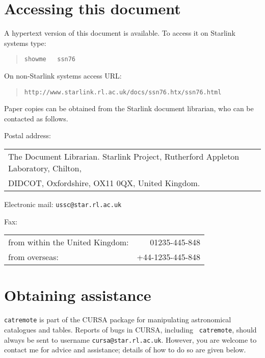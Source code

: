 \documentclass[twoside,11pt]{article}
\newcommand{\htmladdnormallink}[2]{#1}
\renewcommand{\_}{\texttt{\symbol{95}}}
\begin{document}
\newpage
\section*{Accessing this document}

A hypertext version of this document is available.  To access it on
Starlink systems type:

\begin{quote}
{\tt showme ~ ssn76}
\end{quote}

On non-Starlink systems access URL:

\begin{quote}
\htmladdnormallink{
{\tt http://www.starlink.rl.ac.uk/docs/ssn76.htx/ssn76.html}}
{http://www.starlink.rl.ac.uk/docs/ssn75.htx/ssn76.html}
\end{quote}

Paper copies can be obtained from the Starlink document librarian,
who can be contacted as follows.

Postal address: \\
\begin{tabular}{l}
The Document Librarian. Starlink Project, Rutherford Appleton Laboratory, 
  Chilton, \\
DIDCOT, Oxfordshire, OX11 0QX, United Kingdom.                \\
\end{tabular}


Electronic mail: {\tt ussc@star.rl.ac.uk}


Fax: \\
\begin{tabular}{lr}
from within the United Kingdom: &    01235-445-848 \\
from overseas:                  & +44-1235-445-848 \\
\end{tabular}


\section*{Obtaining assistance}

{\tt catremote} is part of the CURSA package for manipulating astronomical
catalogues and tables.  Reports of bugs in CURSA, including {\tt
catremote}, should always be sent to username {\tt cursa@star.rl.ac.uk}.
However, you are welcome to contact me for advice and assistance; details
of how to do so are given below.
\end{document}
